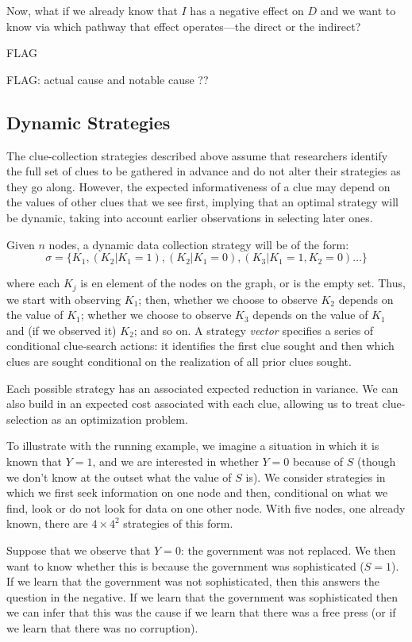 \documentclass[12pt,]{book}
\begin{document}
Now, what if we already know that \(I\) has a negative effect on \(D\) and we want to know via which pathway that effect operates---the direct or the indirect?

FLAG

FLAG: actual cause and notable cause ??

\hypertarget{dynamic-strategies}{%
\subsection{Dynamic Strategies}\label{dynamic-strategies}}

The clue-collection strategies described above assume that researchers identify the full set of clues to be gathered in advance and do not alter their strategies as they go along. However, the expected informativeness of a clue may depend on the values of other clues that we see first, implying that an optimal strategy will be dynamic, taking into account earlier observations in selecting later ones.

Given \(n\) nodes, a dynamic data collection strategy will be of the form:
\[\sigma = \{K_1, (K_2|K_1 = 1), (K_2|K_1 = 0), (K_3|K_1=1, K_2 =0)\dots\}\]

where each \(K_j\) is en element of the nodes on the graph, or is the empty set. Thus, we start with observing \(K_1\); then, whether we choose to observe \(K_2\) depends on the value of \(K_1\); whether we choose to observe \(K_3\) depends on the value of \(K_1\) and (if we observed it) \(K_2\); and so on. A strategy \emph{vector} specifies a series of conditional clue-search actions: it identifies the first clue sought and then which clues are sought conditional on the realization of all prior clues sought.

Each possible strategy has an associated expected reduction in variance. We can also build in an expected cost associated with each clue, allowing us to treat clue-selection as an optimization problem.

To illustrate with the running example, we imagine a situation in which it is known that \(Y=1\), and we are interested in whether \(Y=0\) because of \(S\) (though we don't know at the outset what the value of \(S\) is). We consider strategies in which we first seek information on one node and then, conditional on what we find, look or do not look for data on one other node. With five nodes, one already known, there are \(4 \times 4^2\) strategies of this form.

Suppose that we observe that \(Y=0\): the government was not replaced. We then want to know whether this is because the government was sophisticated (\(S=1\)). If we learn that the government was not sophisticated, then this answers the question in the negative. If we learn that the government was sophisticated then we can infer that this was the cause if we learn that there was a free press (or if we learn that there was no corruption).
\end{document}
